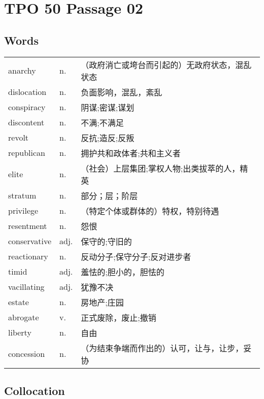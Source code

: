 \section{TPO 50 Passage 02}

\subsection{Words}

\begin{tabular}{lll}
    anarchy      & n.   & （政府消亡或垮台而引起的）无政府状态，混乱状态 \\
    dislocation  & n.   & 负面影响，混乱，紊乱              \\
    conspiracy   & n.   & 阴谋;密谋;谋划                \\
    discontent   & n.   & 不满;不满足                  \\
    revolt       & n.   & 反抗;造反;反叛                \\
    republican   & n.   & 拥护共和政体者;共和主义者           \\
    elite        & n.   & （社会）上层集团;掌权人物;出类拔萃的人，精英 \\
    stratum      & n.   & 部分；层；阶层                 \\
    privilege    & n.   & （特定个体或群体的）特权，特别待遇       \\
    resentment   & n.   & 怨恨                      \\
    conservative & adj. & 保守的;守旧的                 \\
    reactionary  & n.   & 反动分子;保守分子;反对进步者         \\
    timid        & adj. & 羞怯的;胆小的，胆怯的             \\
    vacillating  & adj. & 犹豫不决                    \\
    estate       & n.   & 房地产;庄园                  \\
    abrogate     & v.   & 正式废除，废止;撤销              \\
    liberty      & n.   & 自由                      \\
    concession   & n.   & （为结束争端而作出的）认可，让与，让步，妥协  \\
\end{tabular}

\subsection{Collocation}

